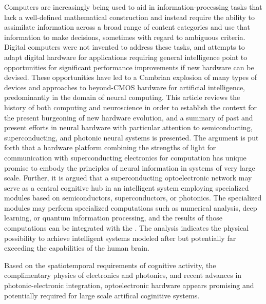 Computers are increasingly being used to aid in information-processing tasks that lack a well-defined mathematical construction and instead require the ability to assimilate information across a broad range of content categories and use that information to make decisions, sometimes with regard to ambiguous criteria. Digital computers were not invented to address these tasks, and attempts to adapt digital hardware for applications requiring general intelligence point to opportunities for significant performance improvements if new hardware can be devised. These opportunities have led to a Cambrian explosion of many types of devices and approaches to beyond-CMOS hardware for artificial intelligence, predominantly in the domain of neural computing. This article reviews the history of both computing and neuroscience in order to establish the context for the present burgeoning of new hardware evolution, and a summary of past and present efforts in neural hardware with particular attention to semiconducting, superconducting, and photonic neural systems is presented. The argument is put forth that a hardware platform combining the strengths of light for communication with superconducting electronics for computation has unique promise to embody the principles of neural information in systems of very large scale. Further, it is argued that a superconducting optoelectronic network may serve as a central cognitive hub in an intelligent system employing specialized modules based on semiconductors, superconductors, or photonics. The specialized modules may perform specialized computations such as numerical analysis, deep learning, or quantum information processing, and the results of those computations can be integrated with the . The analysis indicates the physical possibility to achieve intelligent systems modeled after but potentially far exceeding the capabilities of the human brain.

Based on the spatiotemporal requirements of cognitive activity, the complimentary physics of electronics and photonics, and recent advances in photonic-electronic integration, optoelectronic hardware appears promising and potentially required for large scale artifical coginitive systems. 